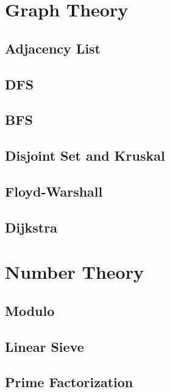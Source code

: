 \section{Graph Theory}
    \subsection{Adjacency List}
            
    \subsection{DFS}
        
    \subsection{BFS}
        
    \subsection{Disjoint Set and Kruskal}
        
    \subsection{Floyd-Warshall}
        
    \subsection{Dijkstra}
        

\section{Number Theory}
    \subsection{Modulo}
        
    \subsection{Linear Sieve}
        
    \subsection{Prime Factorization}
        